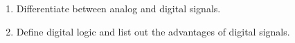 \documentclass[a4paper,12pt]{article}
\begin{document}
\section{}

\begin{enumerate}
\item
    Differentiate between analog and digital signals.
\item 
    Define digital logic and list out the advantages of digital signals. 
\end{enumerate}
\end{document}
